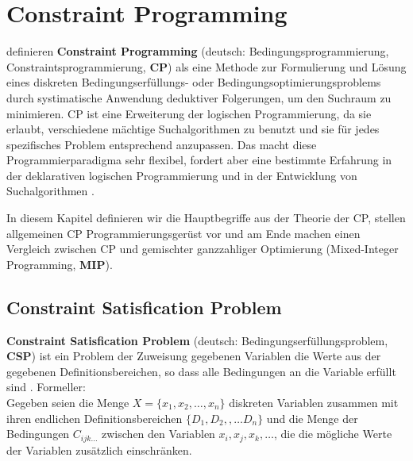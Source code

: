 \chapter{Constraint Programming}
\label{sec:CP}

\cite{CPforScheduling} definieren {\bf Constraint Programming} (deutsch: Bedingungsprogrammierung, Constraintsprogrammierung, {\bf CP}) als eine Methode zur Formulierung und Lösung eines diskreten Bedingungserfüllungs- oder Bedingungsoptimierungsproblems durch systimatische Anwendung deduktiver Folgerungen, um den Suchraum zu minimieren. CP ist eine Erweiterung der logischen Programmierung, da sie erlaubt,  verschiedene mächtige Suchalgorithmen zu benutzt und sie für jedes spezifisches Problem entsprechend anzupassen. Das macht diese Programmierparadigma sehr flexibel, fordert aber eine bestimmte Erfahrung in der deklarativen logischen Programmierung und in der Entwicklung von Suchalgorithmen \citep[vgl][]{CPforScheduling}.

In diesem Kapitel definieren wir die Hauptbegriffe aus der Theorie der CP, stellen allgemeinen CP Programmierungsgerüst vor und am Ende machen einen Vergleich zwischen CP und gemischter ganzzahliger Optimierung (Mixed-Integer Programming, {\bf MIP}).

\section{Constraint Satisfication Problem}

{\bf Constraint Satisfication Problem} (deutsch: Bedingungserfüllungsproblem, {\bf CSP}) ist ein Problem der Zuweisung gegebenen Variablen die Werte aus der gegebenen Definitionsbereichen, so dass alle Bedingungen an die Variable erfüllt sind \citep[vgl][]{CSP}. Formeller:\\
Gegeben seien die Menge $X= \{ x_1,x_2,\dots, x_n\}$ diskreten Variablen zusammen mit ihren endlichen Definitionsbereichen $\{ D_1,D_2,,\dots D_n\}$ und die Menge der Bedingungen $C_{ijk\dots}$ zwischen den Variablen $x_i, x_j, x_k, \dots$, die die mögliche Werte der Variablen zusätzlich einschränken.

